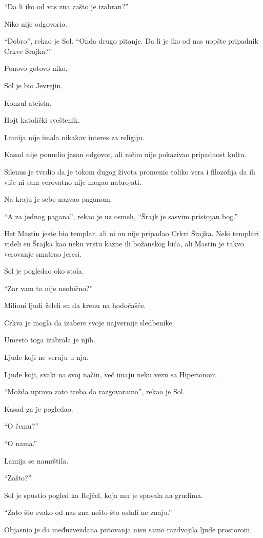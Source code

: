 ``Da li iko od vas zna zašto je izabran?''

Niko nije odgovorio.

``Dobro'', rekao je Sol. ``Onda drugo pitanje. Da li je iko od nas uopšte pripadnik Crkve Šrajka?''

Ponovo gotovo niko.

Sol je bio Jevrejin.

Konzul ateista.

Hojt katolički sveštenik.

Lamija nije imala nikakav interes za religiju.

Kasad nije ponudio jasan odgovor, ali ničim nije pokazivao pripadnost kultu.

Silenus je tvrdio da je tokom dugog života promenio toliko vera i filozofija da ih više ni sam verovatno nije mogao nabrojati.

Na kraju je sebe nazvao paganom.

``A za jednog pagana'', rekao je uz osmeh, ``Šrajk je sasvim pristojan bog.''

Het Mastin jeste bio templar, ali ni on nije pripadao Crkvi Šrajka. Neki templari videli su Šrajka kao neku vrstu kazne ili božanskog bića, ali Mastin je takvo verovanje smatrao jeresi.

Sol je pogledao oko stola.

``Zar vam to nije neobično?''

Milioni ljudi želeli su da krenu na hodočašće.

Crkva je mogla da izabere svoje najvernije sledbenike.

Umesto toga izabrala je njih.

Ljude koji ne veruju u nju.

Ljude koji, svaki na svoj način, već imaju neku vezu sa Hiperionom.

``Možda upravo zato treba da razgovaramo'', rekao je Sol.

Kasad ga je pogledao.

``O čemu?''

``O nama.''

Lamija se namrštila.

``Zašto?''

Sol je spustio pogled ka Rejčel, koja mu je spavala na grudima.

``Zato što svako od nas zna nešto što ostali ne znaju.''

Objasnio je da međuzvezdana putovanja nisu samo razdvojila ljude prostorom.

